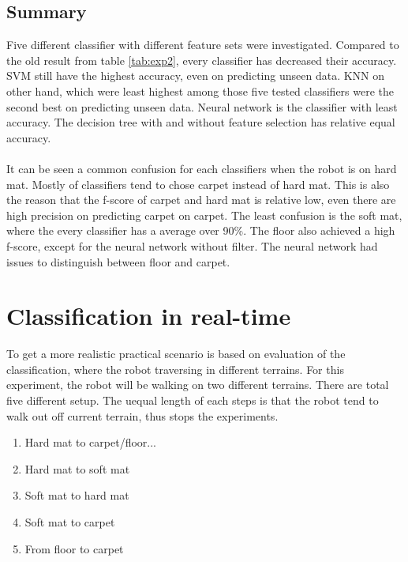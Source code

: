 \documentclass[USenglish]{ifimaster}  %
\begin{document}
\subsection{Summary}
Five different classifier with different feature sets were investigated. Compared to the old result from table \ref{tab:exp2}, every classifier has decreased their accuracy. SVM still have the highest accuracy, even on predicting unseen data. KNN on other hand, which were least highest among those five tested classifiers were the second best on predicting unseen data. Neural network is the classifier with least accuracy. The decision tree with and without feature selection has relative equal accuracy.
\\
\\
It can be seen a common confusion for each classifiers when the robot is on hard mat. Mostly of classifiers tend to chose carpet instead of hard mat. This is also the reason that the f-score of carpet and hard mat is relative low, even there are high precision on predicting carpet on carpet. The least confusion is the soft mat, where the every classifier has a average over 90\%. The floor also achieved a high f-score, except for the neural network without filter. The neural network had issues to distinguish between floor and carpet. 



\section{Classification in real-time} \label{sec:realtime}
To get a more realistic practical scenario  is based on evaluation of the classification, where the robot traversing in different terrains. For this experiment, the robot will be walking on two different terrains. There are total five different setup. The uequal length of each steps is that the robot tend to walk out off current terrain, thus stops the experiments. 


\begin{enumerate}
\item Hard mat to carpet/floor...
\item Hard mat to soft mat
\item Soft mat to hard mat
\item Soft mat to carpet
\item From floor to carpet
\end{enumerate}
\end{document}
